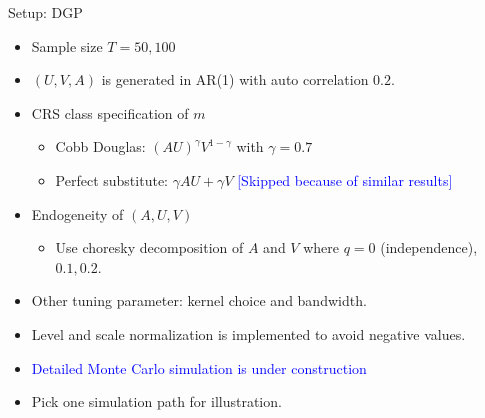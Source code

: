 \documentclass[aspectratio=169]{beamer}
\begin{document}
\begin{frame}{Setup: DGP}
\begin{itemize}
    \item Sample size $T=50,100$
    \item $(U,V,A)$ is generated in AR(1) with auto correlation $0.2$.
    \item CRS class specification of $m$
    \begin{itemize}
        \item Cobb Douglas: $(AU)^{\gamma}V^{1-\gamma}$ with $\gamma=0.7$
        \item Perfect substitute: $\gamma AU+\gamma V$ \textcolor{blue}{[Skipped because of similar results]}
    \end{itemize}
    \item Endogeneity of $(A,U,V)$
    \begin{itemize}
        \item Use choresky decomposition of $A$ and $V$ where $q=0$ (independence), $0.1, 0.2$.
    \end{itemize}
    \item Other tuning parameter: kernel choice and bandwidth.
    \item Level and scale normalization is implemented to avoid negative values.
    \item \textcolor{blue}{Detailed Monte Carlo simulation is under construction}
    \item Pick one simulation path for illustration.
\end{itemize}
    
\end{frame}
\end{document}
